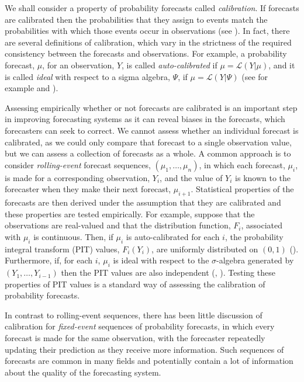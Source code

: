 \documentclass[aap]{imsart}
\theoremstyle{plain}
\theoremstyle{definition}
\begin{document}
We shall consider a property of probability forecasts called \textit{calibration}. If forecasts are calibrated then the probabilities that they assign to events match the probabilities with which those events occur in observations (see \cite{Gnt07}). In fact, there are several definitions of calibration, which vary in the strictness of the required consistency between the forecasts and observations. For example, a probability forecast, $\mu$, for an observation, $Y$, is called \textit{auto-calibrated} if $\mu = \mathcal{L}(Y | \mu)$, and it is called \textit{ideal} with respect to a sigma algebra, $\Psi$, if $\mu = \mathcal{L}(Y | \Psi)$ (see for example \cite{Tsp13} and \cite{Gnt13}).

Assessing empirically whether or not forecasts are calibrated is an important step in improving forecasting systems as it can reveal biases in the forecasts, which forecasters can seek to correct. We cannot assess whether an individual forecast is calibrated, as we could only compare that forecast to a single observation value, but we can assess a collection of forecasts as a whole. A common approach is to consider \textit{rolling-event} forecast sequences, $(\mu_1, \ldots, \mu_n)$, in which each forecast, $\mu_i$, is made for a corresponding observation, $Y_i$, and the value of $Y_i$ is known to the forecaster when they make their next forecast, $\mu_{i+1}$. Statistical properties of the forecasts are then derived under the assumption that they are calibrated and these properties are tested empirically. For example, suppose that the observations are real-valued and that the distribution function, $F_i$, associated with $\mu_i$ is continuous. Then, if $\mu_i$ is auto-calibrated for each $i$, the probability integral transform (PIT) values, $F_i(Y_i)$, are uniformly distributed on $(0, 1)$ (\cite{Gnt13}). Furthermore, if, for each $i$, $\mu_i$ is ideal with respect to the $\sigma$-algebra generated by $(Y_1, \ldots, Y_{i-1})$ then the PIT values are also independent (\cite{Dwd84}, \cite{Dbl98}). Testing these properties of PIT values is a standard way of assessing the calibration of probability forecasts.

In contrast to rolling-event sequences, there has been little discussion of calibration for \textit{fixed-event} sequences of probability forecasts, in which every forecast is made for the same observation, with the forecaster repeatedly updating their prediction as they receive more information. Such sequences of forecasts are common in many fields and potentially contain a lot of information about the quality of the forecasting system.
\end{document}
